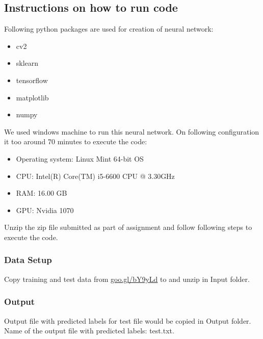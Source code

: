 \documentclass[fleqn,10pt]{SelfArx} %
\begin{document}
\subsection{Instructions on how to run code}
Following python packages are used for creation of neural network:
\begin{itemize}
\itemsep0em
  \item cv2
  \item sklearn
  \item tensorflow
  \item matplotlib
  \item numpy
\end{itemize}
We used windows machine to run this neural network. On following configuration it too around 70 minutes to execute the code:
\begin{itemize}
\itemsep0em
  \item Operating system: Linux Mint 64-bit OS
  \item CPU: Intel(R) Core(TM) i5-6600 CPU @ 3.30GHz
  \item RAM: 16.00 GB
  \item GPU: Nvidia 1070
\end{itemize}
Unzip the zip file submitted as part of assignment and follow following steps to execute the code.
\subsubsection{Data Setup}
Copy training and test data from \url{goo.gl/bY9yLd} to and unzip in Input folder.

\subsubsection{Output}
Output file with predicted labels for test file would be copied in Output folder. Name of the output file with predicted labels: test.txt.
\end{document}
